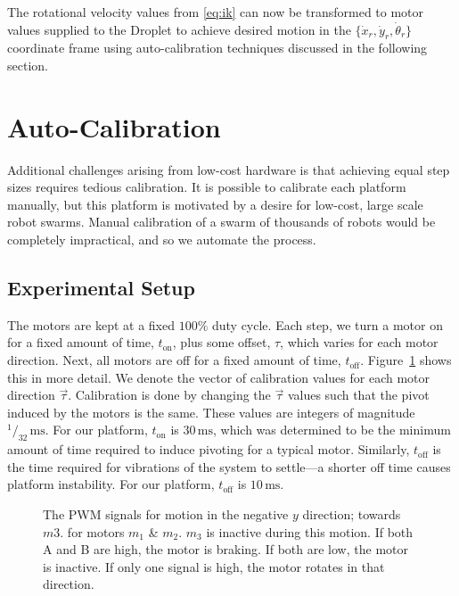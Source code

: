 \documentclass[letterpaper, 10pt, conference]{ieeeconf}
\begin{document}
The rotational velocity values from \eqref{eq:ik} can now be transformed to motor values supplied to the Droplet to achieve desired motion in the $\{\dot{x}_r, \dot{y}_r, \dot{\theta}_r\}$ coordinate frame using auto-calibration techniques discussed in the following section.




\section{Auto-Calibration}
Additional challenges arising from low-cost hardware is that achieving equal step sizes requires tedious calibration.
It is possible to calibrate each platform manually, but this platform is motivated by a desire for low-cost, large scale robot swarms.  Manual calibration of a swarm of thousands of robots would be completely impractical, and so we automate the process. 

\subsection{Experimental Setup}
The motors are kept at a fixed $100\%$ duty cycle. Each step, we turn a motor on for a fixed amount of time, $t_{\text{on}}$, plus some offset, $\tau$,  which varies for each motor direction. Next, all motors are off for a fixed amount of time, $t_{\text{off}}$. Figure~\ref{fig:pwmSignals} shows this in more detail. We denote the vector of calibration values for each motor direction $\vec{\tau}$. Calibration is done by changing the $\vec{\tau}$ values such that the pivot induced by the motors is the same. These values are integers of magnitude $^1/_{32}\,\mathrm{ms}$. For our platform, $t_{\text{on}}$ is $30\,\mathrm{ms}$, which was determined to be the minimum amount of time required to induce pivoting for a typical motor. Similarly, $t_{\text{off}}$ is the time required for vibrations of the system to settle---a shorter off time causes platform instability. For our platform, $t_{\text{off}}$ is $10\,\mathrm{ms}$.

\begin{figure}[!htb]
\centering

\caption{The PWM signals for motion in the negative $y$ direction; towards $m3$. for motors $m_1$ \& $m_2$. $m_3$ is inactive during this motion. If both A and B are high, the motor is braking. If both are low, the motor is inactive. If only one signal is high, the motor rotates in that direction.}
\label{fig:pwmSignals}
\end{figure}
\end{document}

